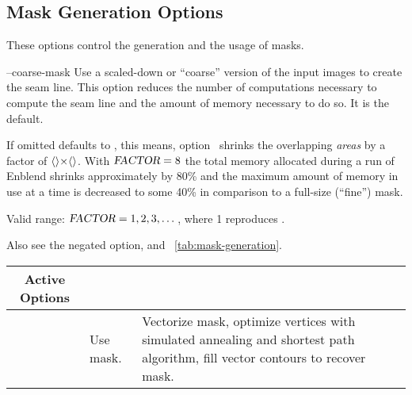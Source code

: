 

\subsection[Mask Generation Options]{\label{sec:mask-generation-options}%
  Mask Generation Options}

These options control the generation and the usage of masks.

\begin{codelist}
  \label{opt:coarse-mask}%
\item[--coarse-mask\optional{=\metavar{FACTOR}}]\itemend
  Use a scaled-down or ``coarse'' version of the input images to create the seam line.  This
  option reduces the number of computations necessary to compute the seam line and the amount of
  memory necessary to do so.  It is the default.

  If omitted  defaults to , this means,
  option~ shrinks the overlapping \emph{areas} by a factor of
  $\val{val:default-coarseness-factor}\classictimes \val{val:default-coarseness-factor}$.  With
  $\textsl{FACTOR} = 8$ the total memory allocated during a run of Enblend shrinks
  approximately by 80\% and the maximum amount of memory in use at a time is decreased to some
  40\% in comparison to a full-size (``fine'') mask.

  Valid range: $\textsl{FACTOR} = 1, 2, 3, \dots$, where 1 reproduces .

  Also see the negated option,  and \tableName~\ref{tab:mask-generation}.

  \begin{table}
    \begin{tabular}{lp{.3\linewidth}p{.4\linewidth}}
      \hline
      \multicolumn{1}{c|}{Active Options} &
      \multicolumn{1}{c|}{\option{--no-optimize}} &
      \multicolumn{1}{c}{\option{--optimize}} \\
      \hline\extraheadingsep
      \option{--fine-mask} & Use \acronym{NFT} mask. & Vectorize \acronym{NFT} mask, optimize
      vertices with simulated annealing and \propername{Dijkstra's} shortest path algorithm,
      fill vector contours to recover mask. \\


\end{tabular}
\end{table}
\end{codelist}

